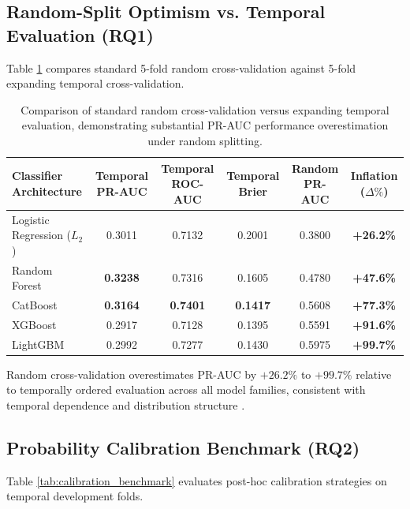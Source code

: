 \documentclass[11pt,a4paper]{article}
\begin{document}
\subsection{Random-Split Optimism vs. Temporal Evaluation (RQ1)}
Table \ref{tab:classifier_benchmark} compares standard 5-fold random cross-validation against 5-fold expanding temporal cross-validation.

\begin{table}[htbp]
\centering
\caption{Comparison of standard random cross-validation versus expanding temporal evaluation, demonstrating substantial PR-AUC performance overestimation under random splitting.}
\label{tab:classifier_benchmark}
\small
\begin{tabular}{lccccc}
\toprule
\textbf{Classifier Architecture} & \textbf{Temporal PR-AUC} & \textbf{Temporal ROC-AUC} & \textbf{Temporal Brier} & \textbf{Random PR-AUC} & \textbf{Inflation ($\Delta\%$)} \\
\midrule
Logistic Regression ($L_2$) & 0.3011 & 0.7132 & 0.2001 & 0.3800 & \textbf{+26.2\%} \\
Random Forest & \textbf{0.3238} & 0.7316 & 0.1605 & 0.4780 & \textbf{+47.6\%} \\
CatBoost & \textbf{0.3164} & \textbf{0.7401} & \textbf{0.1417} & 0.5608 & \textbf{+77.3\%} \\
XGBoost & 0.2917 & 0.7128 & 0.1395 & 0.5591 & \textbf{+91.6\%} \\
LightGBM & 0.2992 & 0.7277 & 0.1430 & 0.5975 & \textbf{+99.7\%} \\
\bottomrule
\end{tabular}
\end{table}

Random cross-validation overestimates PR-AUC by $+26.2\%$ to $+99.7\%$ relative to temporally ordered evaluation across all model families, consistent with temporal dependence and distribution structure \cite{kapoor2023leakage, roberts2017crossvalidation}.

\subsection{Probability Calibration Benchmark (RQ2)}
Table \ref{tab:calibration_benchmark} evaluates post-hoc calibration strategies on temporal development folds.
\end{document}
